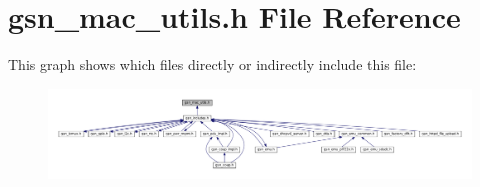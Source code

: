 \hypertarget{a00524}{
\section{gsn\_\-mac\_\-utils.h File Reference}
\label{a00524}
}
This graph shows which files directly or indirectly include this file:
\nopagebreak
\begin{figure}[H]
\begin{center}
\leavevmode
\includegraphics[width=400pt]{a00759}
\end{center}
\end{figure}
